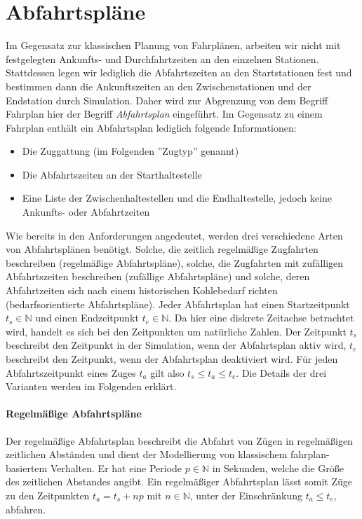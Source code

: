 \section{Abfahrtspläne}

Im Gegensatz zur klassischen Planung von Fahrplänen, arbeiten wir nicht mit festgelegten Ankunfts- und Durchfahrtzeiten an den einzelnen Stationen. Stattdessen legen wir lediglich die Abfahrtszeiten an den Startstationen fest und bestimmen dann die Ankunftszeiten an den Zwischenstationen und der Endstation durch Simulation. Daher wird zur Abgrenzung von dem Begriff Fahrplan hier der Begriff \emph{Abfahrtsplan} eingeführt. Im Gegensatz zu einem Fahrplan enthält ein Abfahrtsplan lediglich folgende Informationen:
\begin{itemize}
    \item Die Zuggattung (im Folgenden ''Zugtyp'' genannt)
    \item Die Abfahrtszeiten an der Starthaltestelle
    \item Eine Liste der Zwischenhaltestellen und die Endhaltestelle, jedoch keine Ankunfts- oder Abfahrtzeiten
\end{itemize}
 Wie bereits in den Anforderungen angedeutet, werden drei verschiedene Arten von Abfahrtsplänen benötigt. Solche, die zeitlich regelmäßige Zugfahrten beschreiben (regelmäßige Abfahrtspläne), solche, die Zugfahrten mit zufälligen Abfahrtszeiten beschreiben (zufällige Abfahrtspläne) und solche, deren Abfahrtzeiten sich nach einem historischen Kohlebedarf richten (bedarfsorientierte Abfahrtspläne). Jeder Abfahrtsplan hat einen Startzeitpunkt $t_s \in \mathbb{N}$ und einen Endzeitpunkt $t_e \in \mathbb{N}$. Da hier eine diskrete Zeitachse betrachtet wird, handelt es sich bei den Zeitpunkten um natürliche Zahlen. Der Zeitpunkt $t_s$ beschreibt den Zeitpunkt in der Simulation, wenn der Abfahrtsplan aktiv wird, $t_e$ beschreibt den Zeitpunkt, wenn der Abfahrtsplan deaktiviert wird. Für jeden Abfahrtszeitpunkt eines Zuges $t_a$ gilt also $t_s\leq t_a \leq t_e$. Die Details der drei Varianten werden im Folgenden erklärt.

\paragraph*{Regelmäßige Abfahrtspläne}

Der regelmäßige Abfahrtsplan beschreibt die Abfahrt von Zügen in regelmäßigen zeitlichen Abständen und dient der Modellierung von klassischem fahrplan-basiertem Verhalten. Er hat eine Periode $p\in\mathbb{N}$ in Sekunden, welche die Größe des zeitlichen Abstandes angibt. Ein regelmäßiger Abfahrtsplan lässt somit Züge zu den Zeitpunkten $t_a=t_s+np$ mit $n\in\mathbb{N}$, unter der Einschränkung $t_a\leq t_e$, abfahren.

